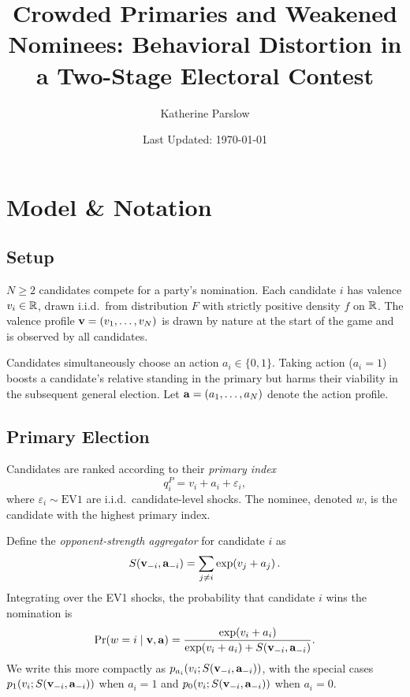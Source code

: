 \documentclass[12pt]{article}
\title{Crowded Primaries and Weakened Nominees: Behavioral Distortion in a Two-Stage Electoral Contest}
\author{Katherine Parslow}
\date{Last Updated: \today}
\begin{document}
\maketitle

\section*{Model \& Notation}

\subsection*{Setup}

$N \ge 2$ candidates compete for a party's nomination.
Each candidate $i$ has valence $v_i \in \mathbb{R}$, drawn i.i.d.\ from distribution $F$
with strictly positive density $f$ on $\mathbb{R}$.
The valence profile $\mathbf v = (v_1,\dots,v_N)$ is drawn by nature at the start of the game
and is observed by all candidates.

Candidates simultaneously choose an action $a_i \in \{0,1\}$.
Taking action ($a_i = 1$) boosts a candidate's relative standing in the primary
but harms their viability in the subsequent general election.
Let $\mathbf a = (a_1,\dots,a_N)$ denote the action profile.

\subsection*{Primary Election}

Candidates are ranked according to their \emph{primary index}
\begin{equation}
    q_i^P = v_i + a_i + \varepsilon_i,
    \label{eq:primary-index}
\end{equation}
where $\varepsilon_i \sim \text{EV1}$ are i.i.d.\ candidate-level shocks.
The nominee, denoted $w$, is the candidate with the highest primary index.

Define the \emph{opponent-strength aggregator} for candidate $i$ as
\[
    S\!\left(\mathbf v_{-i},\mathbf a_{-i}\right) = \sum_{j \neq i} \exp\!\left(v_j + a_j\right).
\]
Integrating over the EV1 shocks, the probability that candidate $i$ wins the nomination is
\begin{equation}
    \Pr(w = i \mid \mathbf v, \mathbf a)
        = \frac{\exp\!\left(v_i+a_i\right)}{\exp\!\left(v_i+a_i\right)+S\!\left(\mathbf v_{-i},\mathbf a_{-i}\right)}.
    \label{eq:primary-prob}
\end{equation}
We write this more compactly as $p_{a_i}\!\left(v_i;S\!\left(\mathbf v_{-i},\mathbf a_{-i}\right)\right)$,
with the special cases $p_{1}\!\left(v_i;S\!\left(\mathbf v_{-i},\mathbf a_{-i}\right)\right)$ when $a_i = 1$
and $p_{0}\!\left(v_i;S\!\left(\mathbf v_{-i},\mathbf a_{-i}\right)\right)$ when $a_i = 0$.
\end{document}

